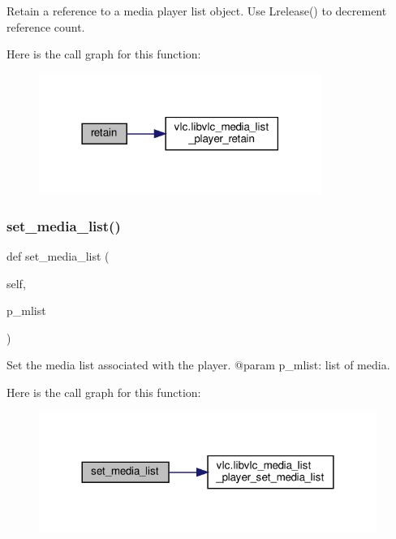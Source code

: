 \begin{DoxyVerb}Retain a reference to a media player list object. Use
L{release}() to decrement reference count.
\end{DoxyVerb}
 Here is the call graph for this function\+:
\nopagebreak
\begin{figure}[H]
\begin{center}
\leavevmode
\includegraphics[width=261pt]{classvlc_1_1_media_list_player_a6394d82a0b79f0f91bb059d20ab43490_cgraph}
\end{center}
\end{figure}
\mbox{\label{classvlc_1_1_media_list_player_a1c53c0a0c9f96653a3c38cc54986b4e7}} 
\subsubsection{\texorpdfstring{set\+\_\+media\+\_\+list()}{set\_media\_list()}}
{\footnotesize\ttfamily def set\+\_\+media\+\_\+list (\begin{DoxyParamCaption}\item[{}]{self,  }\item[{}]{p\+\_\+mlist }\end{DoxyParamCaption})}

\begin{DoxyVerb}Set the media list associated with the player.
@param p_mlist: list of media.
\end{DoxyVerb}
 Here is the call graph for this function\+:
\nopagebreak
\begin{figure}[H]
\begin{center}
\leavevmode
\includegraphics[width=312pt]{classvlc_1_1_media_list_player_a1c53c0a0c9f96653a3c38cc54986b4e7_cgraph}
\end{center}
\end{figure}
\mbox{\label{classvlc_1_1_media_list_player_a27e9842493d76d15873d9f12d4b93440}} 

